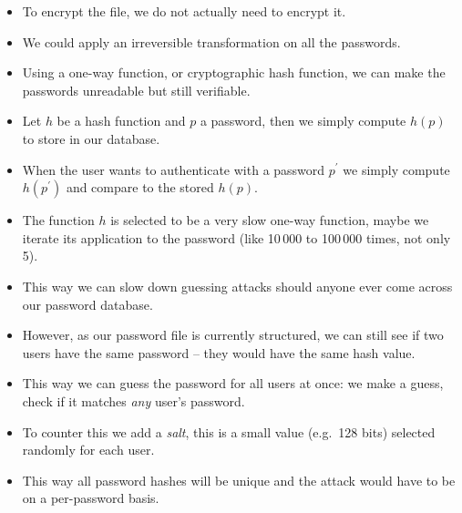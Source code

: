 \begin{frame}
  \begin{itemize}
    \item To encrypt the file, we do not actually need to encrypt it.

    \item We could apply an irreversible transformation on all the passwords.

    \item Using a one-way function, or cryptographic hash function, we can make 
      the passwords unreadable but still verifiable.

    \item Let \(h\) be a hash function and \(p\) a password, then we simply 
      compute \(h(p)\) to store in our database.

    \item When the user wants to authenticate with a password \(p^\prime\) we 
      simply compute \(h(p^\prime)\) and compare to the stored \(h(p)\).

  \end{itemize}
\end{frame}

\begin{frame}
  \begin{itemize}
    \item The function \(h\) is selected to be a very slow one-way function, 
      maybe we iterate its application to the password (like 10\,000 to 
      100\,000 times, not only 5).

    \item This way we can slow down guessing attacks should anyone ever come 
      across our password database.

    \item However, as our password file is currently structured, we can still 
      see if two users have the same password -- they would have the same hash 
      value.

    \item This way we can guess the password for all users at once: we make 
      a guess, check if it matches \emph{any} user's password.

    \item To counter this we add a \emph{salt}, this is a small value (e.g.\ 
      128 bits) selected randomly for each user.

    \item This way all password hashes will be unique and the attack would have 
      to be on a per-password basis.

  \end{itemize}
\end{frame}

